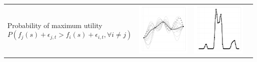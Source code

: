 \documentclass[a4paper,natbib]{apa6}
\begin{document}
\begin{table}[h!]
\begin{tabular}{lccc}
\parbox[b]{5cm}{Probability of maximum utility $$P(f_j(s) + \epsilon_{j,t} > f_{i}(s) + \epsilon_{i,t}, \forall i \neq j)$$\\} &
\includegraphics[scale=0.2]{figure18.pdf} &  
\includegraphics[scale=0.2]{figure19.pdf} &  

\end{tabular}
\end{table}
\end{document}
